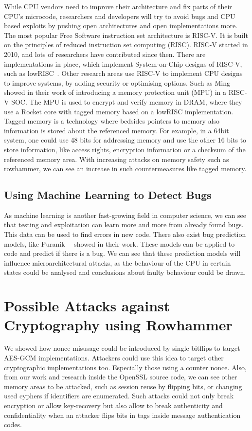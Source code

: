 While CPU vendors need to improve their architecture and fix parts of their
CPU's microcode, researchers and developers will try to avoid bugs and CPU based
exploits by pushing open architectures and open implementations more. The most
popular Free Software instruction set architecture is RISC-V. It is built on the
principles of reduced instruction set computing (RISC). RISC-V started in 2010,
and lots of researchers have contributed since then. There are implementations
in place, which implement System-on-Chip designs of RISC-V, such as
lowRISC~\cite{lowrisc}. Other research areas use RISC-V  to implement CPU
designs to improve systems, by adding security or optimising options. Such as
Ming~\etal~\cite{smarts} showed in their work of introducing a memory protection
unit (MPU) in a RISC-V SOC. The MPU is used to encrypt and verify memory in
DRAM, where they use a Rocket core with tagged memory based on a lowRISC
implementation. Tagged memory is a technology where bedsides pointers to memory
also information is stored about the referenced memory. For example, in a 64bit
system, one could use 48 bits for addressing memory and use the other 16 bits to
store information, like access rights, encryption information or a checksum of
the referenced memory area. With increasing attacks on memory safety such as
rowhammer, we can see an increase in such countermeasures like tagged memory.

\subsection{Using Machine Learning to Detect Bugs}

As machine learning is another fast-growing field in computer science, we can
see that testing and exploitation can learn more and more from already found
bugs. This data can be used to find errors in new code. There also exist bug
prediction models, like Puranik~\etal~\cite{bugprediction} showed in their work.
These models can be applied to code and predict if there is a bug. We can see
that these prediction models will influence microarchitectural attacks, as the
behaviour of the CPU in certain states could be analysed and conclusions about
faulty behaviour could be drawn.

\section{Possible Attacks against Cryptography using Rowhammer}

We showed how nonce misusage could be introduced by single bitflips to target
AES-GCM implementations. Attackers could use this idea to target other
cryptographic implementations too. Especially those using a counter nonce. Also,
from our work and research inside the OpenSSL source code, we can see other
memory areas to be attacked, such as session reuse by flipping bits, or changing
used cyphers if identifiers are enumerated. Such attacks could not only break
encryption or allow key-recovery but also allow to break authenticity and
confidentiality when an attacker flips bits in tags inside message
authentication codes.

